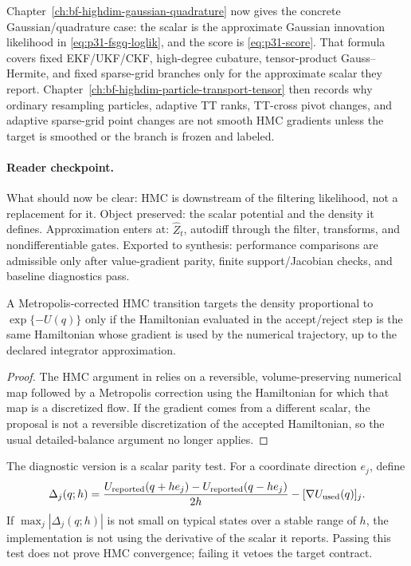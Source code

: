 Chapter~\ref{ch:bf-highdim-gaussian-quadrature} now gives the concrete
Gaussian/quadrature case: the scalar is the approximate Gaussian innovation
likelihood in \eqref{eq:p31-fsgq-loglik}, and the score is
\eqref{eq:p31-score}.  That formula covers fixed EKF/UKF/CKF,
high-degree cubature, tensor-product Gauss--Hermite, and fixed sparse-grid
branches only for the approximate scalar they report.  Chapter~\ref{ch:bf-highdim-particle-transport-tensor}
then records why ordinary resampling particles, adaptive TT ranks, TT-cross
pivot changes, and adaptive sparse-grid point changes are not smooth HMC
gradients unless the target is smoothed or the branch is frozen and labeled.

\paragraph{Reader checkpoint.}
What should now be clear: HMC is downstream of the filtering likelihood, not a
replacement for it.  Object preserved: the scalar potential and the density it
defines.  Approximation enters at: \(\widehat Z_t\), autodiff through the
filter, transforms, and nondifferentiable gates.  Exported to synthesis:
performance comparisons are admissible only after value-gradient parity,
finite support/Jacobian checks, and baseline diagnostics pass.

\begin{proposition}
\label{prop:bf-hd-same-scalar}
A Metropolis-corrected HMC transition targets the density proportional to
$\exp\{-U(q)\}$ only if the Hamiltonian evaluated in the accept/reject step is
the same Hamiltonian whose gradient is used by the numerical trajectory, up to
the declared integrator approximation.
\end{proposition}

\begin{proof}
The HMC argument in \citet{neal2011mcmc} relies on a reversible,
volume-preserving numerical map followed by a Metropolis correction using the
Hamiltonian for which that map is a discretized flow.  If the gradient comes
from a different scalar, the proposal is not a reversible discretization of the
accepted Hamiltonian, so the usual detailed-balance argument no longer applies.
\end{proof}

The diagnostic version is a scalar parity test.  For a coordinate direction
\(e_j\), define
\[
  \Delta_j(q;h)=
  \frac{U_{\rm reported}(q+h e_j)-U_{\rm reported}(q-h e_j)}{2h}
  -[\nabla U_{\rm used}(q)]_j .
\]
If \(\max_j|\Delta_j(q;h)|\) is not small on typical states over a stable range
of \(h\), the implementation is not using the derivative of the scalar it
reports.  Passing this test does not prove HMC convergence; failing it vetoes
the target contract.

